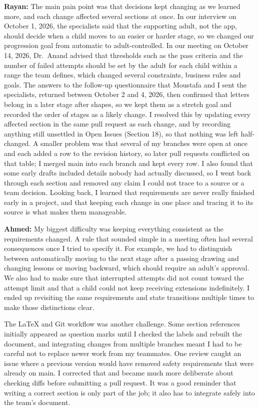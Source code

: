 \documentclass[12pt]{article}
\renewcommand{\_}{\textunderscore\allowbreak}%
\begin{document}
\begin{enumerate}
\textbf{Rayan:} The main pain point was that decisions kept changing as we
learned more, and each change affected several sections at once. In our
interview on October 1, 2026, the specialists said that the supporting adult,
not the app, should decide when a child moves to an easier or harder stage, so
we changed our progression goal from automatic to adult-controlled. In our
meeting on October 14, 2026, Dr.~Anand advised that thresholds such as the pass
criteria and the number of failed attempts should be set by the adult for each
child within a range the team defines, which changed several constraints,
business rules and goals. The answers to the follow-up questionnaire that
Moustafa and I sent the specialists, returned between October 2 and 4, 2026,
then confirmed that letters belong in a later stage after shapes, so we kept
them as a stretch goal and recorded the order of stages as a likely change. I
resolved this by updating every affected section in the same pull request as
each change, and by recording anything still unsettled in Open Issues (Section
18), so that nothing was left half-changed. A smaller problem was that several
of my branches were open at once and each added a row to the revision history,
so later pull requests conflicted on that table; I merged main into each branch
and kept every row. I also found that some early drafts included details nobody
had actually discussed, so I went back through each section and removed any
claim I could not trace to a source or a team decision. Looking back, I learned
that requirements are never really finished early in a project, and that keeping
each change in one place and tracing it to its source is what makes them
manageable.

\textbf{Ahmed:} My biggest difficulty was keeping everything consistent as the
requirements changed. A rule that sounded simple in a meeting often had several
consequences once I tried to specify it. For example, we had to distinguish
between automatically moving to the next stage after a passing drawing and
changing lessons or moving backward, which should require an adult's approval.
We also had to make sure that interrupted attempts did not count toward the
attempt limit and that a child could not keep receiving extensions indefinitely.
I ended up revisiting the same requirements and state transitions multiple times
to make those distinctions clear.

The \LaTeX{} and Git workflow was another challenge. Some section references
initially appeared as question marks until I checked the labels and rebuilt the
document, and integrating changes from multiple branches meant I had to be
careful not to replace newer work from my teammates. One review caught an issue
where a previous version would have removed safety requirements that were
already on main. I corrected that and became much more deliberate about checking
diffs before submitting a pull request. It was a good reminder that writing a
correct section is only part of the job; it also has to integrate safely into
the team's document.


\end{enumerate}
\end{document}
